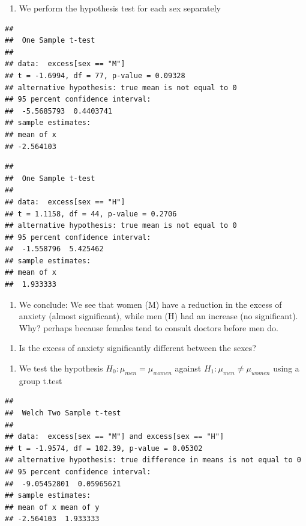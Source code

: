 \documentclass[
]{book}
\providecommand{\tightlist}{%
  \setlength{\itemsep}{0pt}\setlength{\parskip}{0pt}}
\begin{document}
\begin{enumerate}
\def\labelenumi{\alph{enumi}.}
\setcounter{enumi}{1}
\tightlist
\item
  We perform the hypothesis test for each sex separately
\end{enumerate}

\begin{verbatim}
## 
##  One Sample t-test
## 
## data:  excess[sex == "M"]
## t = -1.6994, df = 77, p-value = 0.09328
## alternative hypothesis: true mean is not equal to 0
## 95 percent confidence interval:
##  -5.5685793  0.4403741
## sample estimates:
## mean of x 
## -2.564103
\end{verbatim}

\begin{verbatim}
## 
##  One Sample t-test
## 
## data:  excess[sex == "H"]
## t = 1.1158, df = 44, p-value = 0.2706
## alternative hypothesis: true mean is not equal to 0
## 95 percent confidence interval:
##  -1.558796  5.425462
## sample estimates:
## mean of x 
##  1.933333
\end{verbatim}

\begin{enumerate}
\def\labelenumi{\alph{enumi}.}
\setcounter{enumi}{2}
\tightlist
\item
  We conclude: We see that women (M) have a reduction in the excess of anxiety (almost significant), while men (H) had an increase (no significant). Why? perhaps because females tend to consult doctors before men do.
\end{enumerate}

\begin{enumerate}
\def\labelenumi{\arabic{enumi}.}
\setcounter{enumi}{2}
\tightlist
\item
  Is the excess of anxiety significantly different between the sexes?
\end{enumerate}

\begin{enumerate}
\def\labelenumi{\alph{enumi}.}
\tightlist
\item
  We test the hypothesis \(H_0:\mu_{men}=\mu_{women}\) against \(H_1:\mu_{men}\neq \mu_{women}\) using a group t.test
\end{enumerate}

\begin{verbatim}
## 
##  Welch Two Sample t-test
## 
## data:  excess[sex == "M"] and excess[sex == "H"]
## t = -1.9574, df = 102.39, p-value = 0.05302
## alternative hypothesis: true difference in means is not equal to 0
## 95 percent confidence interval:
##  -9.05452801  0.05965621
## sample estimates:
## mean of x mean of y 
## -2.564103  1.933333
\end{verbatim}
\end{document}
